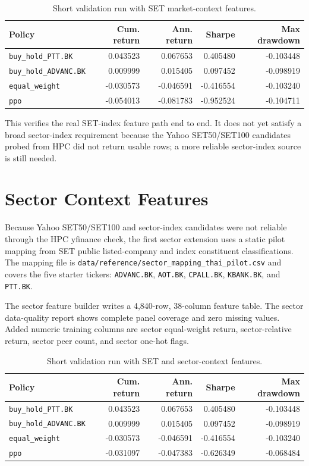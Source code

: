 \documentclass[11pt]{article}
\begin{document}
\begin{table}[h]
\centering
\caption{Short validation run with SET market-context features.}
\label{tab:set-context}
\begin{tabular}{lrrrr}
\toprule
Policy & Cum. return & Ann. return & Sharpe & Max drawdown \\
\midrule
\texttt{buy\_hold\_PTT.BK} & 0.043523 & 0.067653 & 0.405480 & -0.103448 \\
\texttt{buy\_hold\_ADVANC.BK} & 0.009999 & 0.015405 & 0.097452 & -0.098919 \\
\texttt{equal\_weight} & -0.030573 & -0.046591 & -0.416554 & -0.103240 \\
\texttt{ppo} & -0.054013 & -0.081783 & -0.952524 & -0.104711 \\
\bottomrule
\end{tabular}
\end{table}

This verifies the real SET-index feature path end to end. It does not yet satisfy a broad sector-index requirement because the Yahoo SET50/SET100 candidates probed from HPC did not return usable rows; a more reliable sector-index source is still needed.

\section{Sector Context Features}
Because Yahoo SET50/SET100 and sector-index candidates were not reliable through the HPC yfinance check, the first sector extension uses a static pilot mapping from SET public listed-company and index constituent classifications. The mapping file is \texttt{data/reference/sector\_mapping\_thai\_pilot.csv} and covers the five starter tickers: \texttt{ADVANC.BK}, \texttt{AOT.BK}, \texttt{CPALL.BK}, \texttt{KBANK.BK}, and \texttt{PTT.BK}.

The sector feature builder writes a 4,840-row, 38-column feature table. The sector data-quality report shows complete panel coverage and zero missing values. Added numeric training columns are sector equal-weight return, sector-relative return, sector peer count, and sector one-hot flags.

\begin{table}[h]
\centering
\caption{Short validation run with SET and sector-context features.}
\label{tab:sector-context}
\begin{tabular}{lrrrr}
\toprule
Policy & Cum. return & Ann. return & Sharpe & Max drawdown \\
\midrule
\texttt{buy\_hold\_PTT.BK} & 0.043523 & 0.067653 & 0.405480 & -0.103448 \\
\texttt{buy\_hold\_ADVANC.BK} & 0.009999 & 0.015405 & 0.097452 & -0.098919 \\
\texttt{equal\_weight} & -0.030573 & -0.046591 & -0.416554 & -0.103240 \\
\texttt{ppo} & -0.031097 & -0.047383 & -0.626349 & -0.068484 \\
\bottomrule
\end{tabular}
\end{table}
\end{document}
